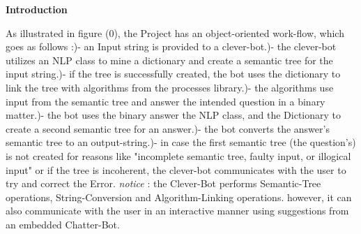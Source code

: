 \documentclass{paper}
\begin{document}
\newpage
\begin{huge}{\textbf{Introduction}}\end{huge}\newline\newline
As illustrated in figure (0), the Project has an object-oriented work-flow, which goes as follows :\newline{})- an Input string is provided to a clever-bot.)- the clever-bot utilizes an NLP class to mine a dictionary and create a semantic tree for the input string.)- if the tree is successfully created, the bot uses the dictionary to link the tree with algorithms from the processes library.)- the algorithms use input from the semantic tree and answer the intended question in a binary matter.)- the bot uses the binary answer the NLP class, and the Dictionary to create a second semantic tree for an answer.)- the bot converts the answer's semantic tree to an output-string.)- in case the first semantic tree (the question's) is not created for reasons like "incomplete semantic tree, faulty input, or illogical input" or if the tree is incoherent, the clever-bot communicates with the user to try and correct the Error.\newline\newline
\textit{notice} : the Clever-Bot performs Semantic-Tree operations, String-Conversion and Algorithm-Linking operations.\newline
however, it can also communicate with the user in an interactive manner using suggestions from an embedded Chatter-Bot.
\end{document}
